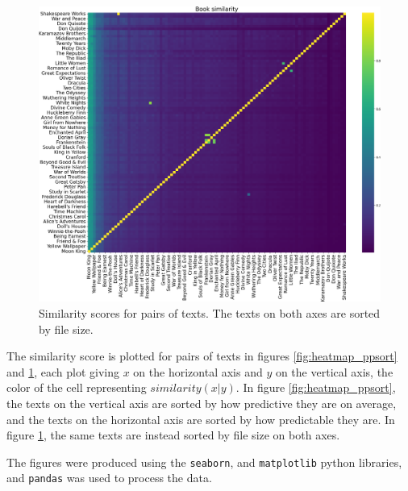 \begin{figure}[t]
\centering
\includegraphics[width=\textwidth]{img/fig_co-compression_file_size.png}
\caption{Similarity scores for pairs of texts. The texts on both axes are sorted by file size.}
\label{fig:heatmap_fsort}
\end{figure}

The similarity score is plotted for pairs of texts in figures \ref{fig:heatmap_ppsort} and \ref{fig:heatmap_fsort}, each plot giving \(x\) on the horizontal axis and \(y\) on the vertical axis, the color of the cell representing \(similarity(x|y)\). In figure \ref{fig:heatmap_ppsort}, the texts on the vertical axis are sorted by how predictive they are on average, and the texts on the horizontal axis are sorted by how predictable they are. In figure \ref{fig:heatmap_fsort}, the same texts are instead sorted by file size on both axes.

The figures were produced using the \texttt{seaborn}, and \texttt{matplotlib} python libraries, and \texttt{pandas} was used to process the data.

